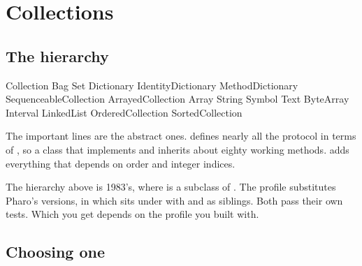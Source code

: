 \chapter{Collections}
\label{ch:collections}


\section{The hierarchy}

\begin{plain}
Collection
  Bag
  Set
    Dictionary
      IdentityDictionary
        MethodDictionary
  SequenceableCollection
    ArrayedCollection
      Array
      String
        Symbol
      Text
      ByteArray
    Interval
    LinkedList
    OrderedCollection
      SortedCollection
\end{plain}

The important lines are the abstract ones.  defines nearly all
the protocol in terms of , so a class that implements  and
 inherits about eighty working methods.
 adds everything that depends on order and
integer indices.

\begin{stnote}
The hierarchy above is 1983's, where  is a subclass of
. The  profile substitutes Pharo's versions, in
which  sits under  with  and
 as siblings. Both pass their own tests. Which you get depends
on the profile you built with.
\end{stnote}

\section{Choosing one}

